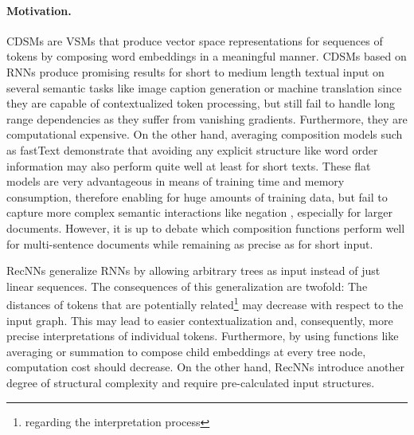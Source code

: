 \paragraph{Motivation.}\acfp{CDSM} are \acp{VSM} that produce vector space representations for sequences of tokens by composing word embeddings in a meaningful manner. \acp{CDSM} based on \acp{RNN} produce promising results for short to medium length textual input on several semantic tasks like image caption generation %
\autocite{vinyals_show_2014} or machine translation \autocite{wu_googles_2016}  %
since they are capable of contextualized token processing, but still fail to handle long range dependencies as they suffer from vanishing gradients. %
Furthermore, they are computational expensive. On the other hand, averaging composition models such as fastText \autocite{joulin_bag_2017} demonstrate that avoiding any explicit structure like word order information %
may also perform quite well at least for short texts. These flat models are very advantageous in means of training time and memory consumption, therefore enabling for huge amounts of training data, but fail to capture more complex semantic interactions like negation  , especially for larger documents. However, it is up to debate which composition functions perform well for multi-sentence documents while remaining as precise as for short input.%

\acp{RecNN} \autocite{goller_learning_1996,socher_parsing_2011} generalize \acp{RNN} by allowing arbitrary trees as input instead of just linear sequences. The consequences of this generalization are twofold: The distances of tokens that are potentially related\footnote{regarding the interpretation process} may decrease with respect to the input graph. This may lead to easier contextualization and, consequently, more precise interpretations of individual tokens. Furthermore, by using functions like averaging or summation to compose child embeddings at every tree node, computation cost should decrease. On the other hand, \acp{RecNN} introduce another degree of structural complexity and require pre-calculated input structures.%

